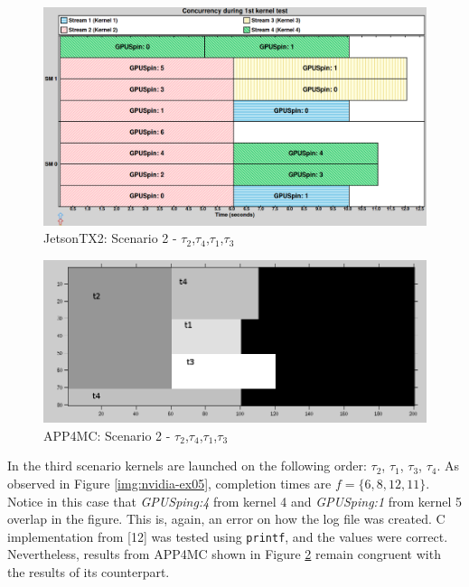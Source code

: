 \documentclass[
  12pt,
  a4paperpaper,
]{report}
\begin{document}
\begin{figure}
\centering
\includegraphics[width=1\textwidth,height=\textheight]{source/figures/nvidia/ex02.png}
\caption{JetsonTX2: Scenario 2 - \(\tau_2\),\(\tau_4\),\(\tau_1\),\(\tau_3\) \label{img:nvidia-ex02}}
\end{figure}

\begin{figure}
\centering
\includegraphics[width=1\textwidth,height=\textheight]{source/figures/octave/ex02.png}
\caption{APP4MC: Scenario 2 - \(\tau_2\),\(\tau_4\),\(\tau_1\),\(\tau_3\) \label{img:octave-ex02}}
\end{figure}

In the third scenario kernels are launched on the following order: \(\tau_2\),
\(\tau_1\), \(\tau_3\), \(\tau_4\). As observed in Figure \ref{img:nvidia-ex05}, completion
times are \(f = \{6,8,12,11\}\). Notice in this case that
\emph{GPUSping:4} from kernel 4 and \emph{GPUSping:1} from kernel 5
overlap in the figure. This is, again, an error on how the log file was
created. C implementation from {[}12{]} was tested using \texttt{printf}, and
the values were correct. Nevertheless, results from APP4MC shown in
Figure \ref{img:octave-ex02} remain congruent with the results of its
counterpart.
\end{document}
